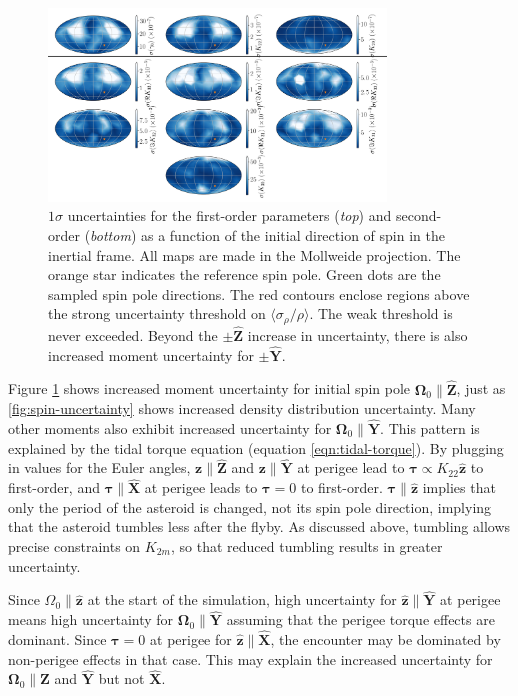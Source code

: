 \documentclass[fleqn,usenatbib]{mnras}
\newcommand{\unit}[1]{\bm{\hat{#1}}}
\begin{document}
\begin{figure}
  \centering
  \includegraphics[width=0.8\textwidth]{figs/spin-pole}
  \caption{$1\sigma$ uncertainties for the first-order parameters (\textit{top}) and second-order (\textit{bottom}) as a function of the initial direction of spin in the inertial frame. All maps are made in the Mollweide projection. The orange star indicates the reference spin pole. Green dots are the sampled spin pole directions. The red contours enclose regions above the strong uncertainty threshold on $\langle \sigma_\rho / \rho \rangle$. The weak threshold is never exceeded. Beyond the $\pm \unit Z$ increase in uncertainty, there is also increased moment uncertainty for $\pm \unit Y$.}
  \label{fig:scan-spin}
\end{figure}

Figure \ref{fig:scan-spin} shows increased moment uncertainty for initial spin pole $\bm \Omega_0 \parallel \unit Z$, just as \ref{fig:spin-uncertainty} shows increased density distribution uncertainty. Many other moments also exhibit increased uncertainty for $\bm \Omega_0 \parallel \unit Y$. This pattern is explained by the tidal torque equation (equation \ref{eqn:tidal-torque}). By plugging in values for the Euler angles, $\bm z \parallel \unit Z$ and $\bm z \parallel \unit Y$ at perigee lead to $\bm \tau \propto K_{22} \unit z$ to first-order, and $\bm \tau \parallel \unit X$ at perigee leads to $\bm \tau = 0$ to first-order. $\bm \tau \parallel \unit z$ implies that only the period of the asteroid is changed, not its spin pole direction, implying that the asteroid tumbles less after the flyby. As discussed above, tumbling allows precise constraints on $K_{2m}$, so that reduced tumbling results in greater uncertainty.

Since $\Omega_0 \parallel \unit z$ at the start of the simulation, high uncertainty for $\unit z \parallel \unit Y$ at perigee means high uncertainty for $\bm \Omega_0 \parallel \unit Y$ assuming that the perigee torque effects are dominant. Since $\bm \tau = 0$ at perigee for $\unit z \parallel \unit X$, the encounter may be dominated by non-perigee effects in that case. This may explain the increased uncertainty for $\bm \Omega_0 \parallel \unit Z$ and $\unit Y$ but not $\unit X$.
\end{document}
